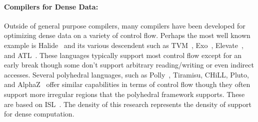 \paragraph{Compilers for Dense Data:}
Outside of general purpose compilers, many compilers have been developed for optimizing dense data on a variety of control flow.
%
Perhaps the most well known example is Halide~\cite{ragan-kelley_halide_2013} and its various descendent such as TVM~\cite{chen2018tvm}, Exo~\cite{ikarashi2022exocompilation}, Elevate~\cite{hagedorn2020achieving}, and ATL~\cite{liu_verified_2022}.
%
These languages typically support most control flow except for an early break though some don't support arbitrary reading/writing or even indirect accesses.
%
Several polyhedral languages, such as Polly~\cite{grosser2012polly}, Tiramisu\cite{baghdadi2019tiramisu}, CHiLL\cite{chen2008framework}, Pluto\cite{bondhugula2008pluto}, and AlphaZ~\cite{yuki2012alphaz} offer similar capabilities in terms of control flow though they often support more irregular regions that the polyhedral framework supports.
%
These are based on ISL~\cite{verdoolaege2010isl}.
%
The density of this research represents the density of support for dense computation.


